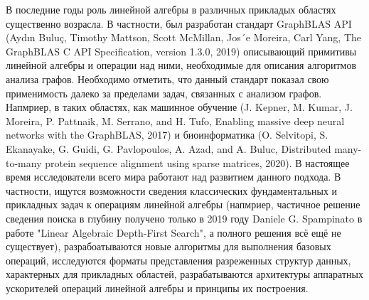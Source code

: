 \documentclass[12pt]{article}  %
\theoremstyle{remark}
\begin{document}
В последние годы роль линейной алгебры в различных прикладых областях существенно возрасла. В частности, был разработан стандарт GraphBLAS API (Aydın Buluç, Timothy Mattson, Scott McMillan, Jos´e Moreira, Carl Yang, The GraphBLAS C API Specification, version 1.3.0, 2019) описывающий примитивы линейной алгебры и операции над ними, необходимые для описания алгоритмов анализа графов. Необходимо отметить, что данный стандарт показал свою применимость далеко за пределами задач, связанных с анализом графов. Напмриер, в таких областях, как машинное обучение (J. Kepner, M. Kumar, J. Moreira, P. Pattnaik, M. Serrano, and H. Tufo, Enabling massive deep neural networks with the GraphBLAS, 2017) и биоинформатика (O. Selvitopi, S. Ekanayake, G. Guidi, G. Pavlopoulos, A. Azad, and A. Buluc, Distributed many-to-many protein sequence alignment using sparse matrices, 2020). В настоящее время исследователи всего мира работают над развитием данного подхода. В частности, ищутся возможности сведения классических фундаментальных и прикладных задач к операциям линейной алгебры (напмриер, частичное решение сведения поиска в глубину получено только в 2019 году Daniele G. Spampinato в работе "Linear Algebraic Depth-First Search", а полного решения всё ещё не существует), разрабоатываются новые алгоритмы для выполнения базовых операций, исследуются форматы представления разреженных структур данных, характерных для прикладных областей, разрабатываются архитектуры аппаратных ускорителей операций линейной алгебры и принципы их построения.
\end{document}
